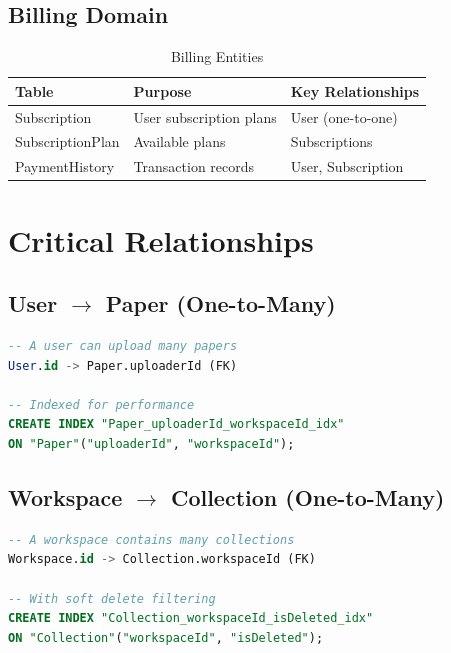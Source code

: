 \subsection{Billing Domain}

\begin{table}[H]
\centering
\caption{Billing Entities}
\label{tab:erd-billing-domain}
\begin{tabular}{@{}llp{6cm}@{}}
\toprule
\textbf{Table} & \textbf{Purpose} & \textbf{Key Relationships} \\
\midrule
Subscription & User subscription plans & User (one-to-one) \\
SubscriptionPlan & Available plans & Subscriptions \\
PaymentHistory & Transaction records & User, Subscription \\
\bottomrule
\end{tabular}
\end{table}

\section{Critical Relationships}
\label{sec:erd-relationships}

\subsection{User \texorpdfstring{$\rightarrow$}{->} Paper (One-to-Many)}

\begin{lstlisting}[language=SQL, caption={User-Paper Relationship}]
-- A user can upload many papers
User.id -> Paper.uploaderId (FK)

-- Indexed for performance
CREATE INDEX "Paper_uploaderId_workspaceId_idx" 
ON "Paper"("uploaderId", "workspaceId");
\end{lstlisting}

\subsection{Workspace \texorpdfstring{$\rightarrow$}{->} Collection (One-to-Many)}

\begin{lstlisting}[language=SQL, caption={Workspace-Collection Relationship}]
-- A workspace contains many collections
Workspace.id -> Collection.workspaceId (FK)

-- With soft delete filtering
CREATE INDEX "Collection_workspaceId_isDeleted_idx" 
ON "Collection"("workspaceId", "isDeleted");
\end{lstlisting}

